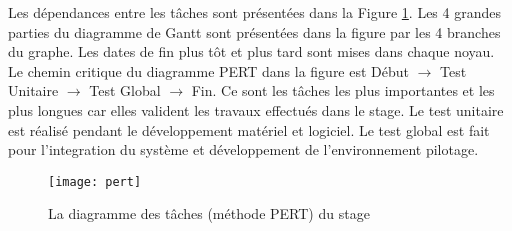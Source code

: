 Les dépendances entre les tâches sont présentées dans la Figure \ref{fig:pert}. 
Les 4 grandes parties du diagramme de Gantt sont présentées dans la figure par les 4 branches du graphe.
Les dates de fin \og plus tôt \fg et \og plus tard \fg sont mises dans chaque noyau. Le chemin critique du diagramme PERT
dans la figure est Début $\rightarrow$ Test Unitaire $\rightarrow$ Test Global $\rightarrow$ Fin. Ce sont les tâches les plus importantes et les plus longues car
elles valident les travaux effectués dans le stage. 
Le test unitaire est réalisé pendant le développement matériel et logiciel. Le test global est fait pour l'integration
du système et développement de l'environnement pilotage.

\begin{figure}[h]
	\centering
	\texttt{[image: pert]}
	\caption{La diagramme des tâches (méthode PERT) du stage}
	\label{fig:pert}
	\vspace{-2mm}
\end{figure}

